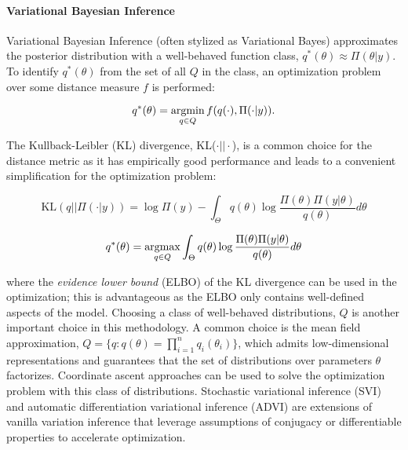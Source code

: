 \paragraph{Variational Bayesian Inference}
Variational Bayesian Inference (often stylized as Variational Bayes) approximates the posterior distribution with a well-behaved function class\autocite{wainwright2008graphical,bishop2006pattern}, $q^*(\theta) \approx \Pi(\theta | y)$. To identify $q^*(\theta)$ from the set of all $Q$ in the class, an optimization problem over some distance measure $f$ is performed:

\begin{equation}
    q^*(\theta) = \mathop\mathrm{arg min}_{q\in Q} f(q(\cdot),\Pi(\cdot|y)).
\end{equation}

The Kullback-Leibler (KL) divergence\autocite{kullback1951information}, KL($\cdot||\cdot$), is a common choice for the distance metric as it has empirically good performance\cite{bishop2006pattern} and leads to a convenient simplification for the optimization problem:

\begin{equation}
    \text{KL}(q||\Pi(\cdot|y)) = \log \Pi(y) - \int_\Theta q(\theta) \log \frac{\Pi(\theta)\Pi(y|\theta)}{q(\theta)}d\theta
\end{equation}

\begin{equation}
    q^*(\theta) = \mathop\mathrm{arg max}_{q\in Q} \int_\Theta q(\theta) \log \frac{\Pi(\theta)\Pi(y|\theta)}{q(\theta)}d\theta
\end{equation}

\noindent where the \emph{evidence lower bound} (ELBO) of the KL divergence can be used in the optimization; this is advantageous as the ELBO only contains well-defined aspects of the model.
Choosing a class of well-behaved distributions, $Q$ is another important choice in this methodology. A common choice is the mean field approximation, $Q = \{q: q(\theta) = \prod_{i=1}^n q_i(\theta_i)\}$, which admits low-dimensional representations and guarantees that the set of distributions over parameters $\theta$ factorizes. Coordinate ascent approaches can be used to solve the optimization problem with this class of distributions\autocite{wainwright2008graphical}. Stochastic variational inference (SVI)\autocite{hoffman2013stochastic} and automatic differentiation variational inference (ADVI)\autocite{kucukelbir2017automatic} are extensions of vanilla variation inference that leverage assumptions of conjugacy or differentiable properties to accelerate optimization.

